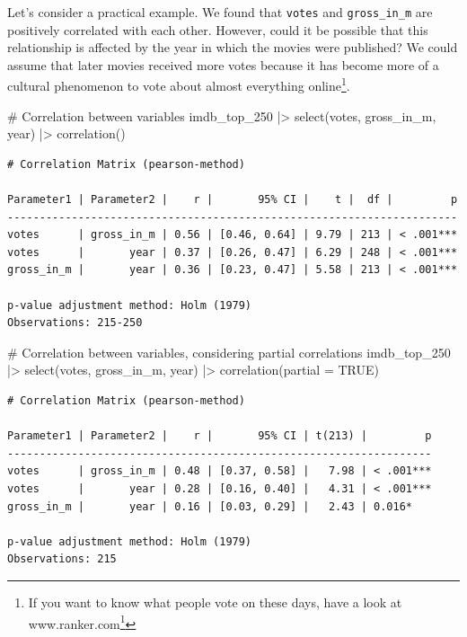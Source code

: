 \documentclass[
  letterpaper,
]{krantz}
\makeatletter
\newenvironment{Shaded}{\begin{snugshade}}{\end{snugshade}}
\newcommand{\AttributeTok}[1]{\textcolor[rgb]{0.40,0.45,0.13}{#1}}
\newcommand{\CommentTok}[1]{\textcolor[rgb]{0.37,0.37,0.37}{#1}}
\newcommand{\ConstantTok}[1]{\textcolor[rgb]{0.56,0.35,0.01}{#1}}
\newcommand{\FunctionTok}[1]{\textcolor[rgb]{0.28,0.35,0.67}{#1}}
\newcommand{\NormalTok}[1]{\textcolor[rgb]{0.00,0.23,0.31}{#1}}
\newcommand{\SpecialCharTok}[1]{\textcolor[rgb]{0.37,0.37,0.37}{#1}}
\renewcommand{\href}[2]{#2\footnote{\url{#1}}}
\newenvironment{kframe}{%
\medskip{}
\setlength{\fboxsep}{.8em}
 \def\at@end@of@kframe{}%
 \ifinner\ifhmode%
  \def\at@end@of@kframe{\end{minipage}}%
  \begin{minipage}{\columnwidth}%
 \fi\fi%
 \def\FrameCommand##1{\hskip\@totalleftmargin \hskip-\fboxsep
 \colorbox{shadecolor}{##1}\hskip-\fboxsep
     \hskip-\linewidth \hskip-\@totalleftmargin \hskip\columnwidth}%
 \MakeFramed {\advance\hsize-\width
   \@totalleftmargin\z@ \linewidth\hsize
   \@setminipage}}%
 {\par\unskip\endMakeFramed%
 \at@end@of@kframe}
\renewenvironment{Shaded}{\begin{kframe}}{\end{kframe}}
\makeatother
\begin{document}
Let's consider a practical example. We found that \texttt{votes} and
\texttt{gross\_in\_m} are positively correlated with each other.
However, could it be possible that this relationship is affected by the
year in which the movies were published? We could assume that later
movies received more votes because it has become more of a cultural
phenomenon to vote about almost everything online\footnote{If you want
  to know what people vote on these days, have a look at
  \href{https://www.ranker.com}{www.ranker.com}}.

\begin{Shaded}
\begin{Highlighting}[]
\CommentTok{\# Correlation between variables}
\NormalTok{imdb\_top\_250 }\SpecialCharTok{|\textgreater{}}
  \FunctionTok{select}\NormalTok{(votes, gross\_in\_m, year) }\SpecialCharTok{|\textgreater{}}
  \FunctionTok{correlation}\NormalTok{()}
\end{Highlighting}
\end{Shaded}

\begin{verbatim}
# Correlation Matrix (pearson-method)

Parameter1 | Parameter2 |    r |       95% CI |    t |  df |         p
----------------------------------------------------------------------
votes      | gross_in_m | 0.56 | [0.46, 0.64] | 9.79 | 213 | < .001***
votes      |       year | 0.37 | [0.26, 0.47] | 6.29 | 248 | < .001***
gross_in_m |       year | 0.36 | [0.23, 0.47] | 5.58 | 213 | < .001***

p-value adjustment method: Holm (1979)
Observations: 215-250
\end{verbatim}

\begin{Shaded}
\begin{Highlighting}[]
\CommentTok{\# Correlation between variables, considering partial correlations}
\NormalTok{imdb\_top\_250 }\SpecialCharTok{|\textgreater{}}
  \FunctionTok{select}\NormalTok{(votes, gross\_in\_m, year) }\SpecialCharTok{|\textgreater{}}
  \FunctionTok{correlation}\NormalTok{(}\AttributeTok{partial =} \ConstantTok{TRUE}\NormalTok{)}
\end{Highlighting}
\end{Shaded}

\begin{verbatim}
# Correlation Matrix (pearson-method)

Parameter1 | Parameter2 |    r |       95% CI | t(213) |         p
------------------------------------------------------------------
votes      | gross_in_m | 0.48 | [0.37, 0.58] |   7.98 | < .001***
votes      |       year | 0.28 | [0.16, 0.40] |   4.31 | < .001***
gross_in_m |       year | 0.16 | [0.03, 0.29] |   2.43 | 0.016*   

p-value adjustment method: Holm (1979)
Observations: 215
\end{verbatim}
\end{document}
